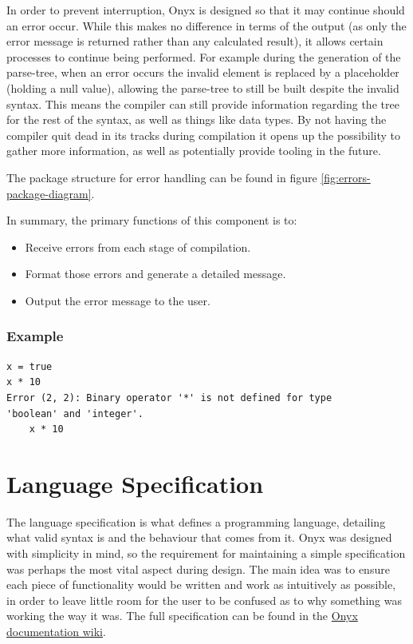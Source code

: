 \documentclass[
]{report}
\begin{document}
In order to prevent interruption, Onyx is designed so that it may
continue should an error occur. While this makes no difference in terms
of the output (as only the error message is returned rather than any
calculated result), it allows certain processes to continue being
performed. For example during the generation of the \gls{parse-tree}, when an
error occurs the invalid element is replaced by a placeholder (holding a
null value), allowing the \gls{parse-tree} to still be built despite the
invalid syntax. This means the compiler can still provide information
regarding the tree for the rest of the syntax, as well as things like
data types. By not having the compiler quit dead in its tracks during
compilation it opens up the possibility to gather more information, as
well as potentially provide tooling in the future.

The package structure for error handling can be found in figure \ref{fig:errors-package-diagram}.

In summary, the primary functions of this component is to:
\begin{itemize}
	\item Receive errors from each stage of compilation.
	\item Format those errors and generate a detailed message.
	\item Output the error message to the user.
\end{itemize}

\subsubsection{Example}
\begin{verbatim}
x = true
x * 10
Error (2, 2): Binary operator '*' is not defined for type 
'boolean' and 'integer'.
    x * 10
\end{verbatim}

\section{Language Specification}
The language specification is what defines a programming language,
detailing what valid syntax is and the behaviour that comes from it.
Onyx was designed with simplicity in mind, so the requirement for
maintaining a simple specification was perhaps the most vital aspect
during design. The main idea was to ensure each piece of functionality
would be written and work as intuitively as possible, in order to leave
little room for the user to be confused as to why something was working
the way it was. The full specification can be found in the
\href{https://github.com/louislefevre/onyx-compiler/wiki}{Onyx
documentation wiki}.
\end{document}
